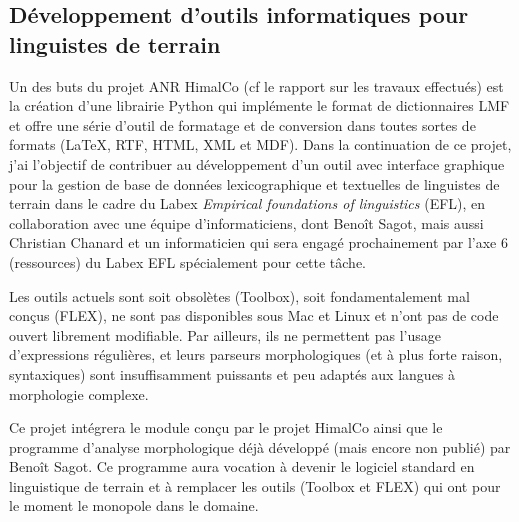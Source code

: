 \documentclass[oldfontcommands,oneside,a4paper,11pt]{article}
\begin{document}
\subsection{Développement d'outils informatiques pour linguistes de terrain} \label{sec:outils}
Un des buts du projet ANR HimalCo (cf le rapport sur les travaux effectués) est   la création d'une librairie Python qui implémente le format de dictionnaires LMF et offre une série d'outil de formatage et de conversion dans toutes sortes de formats (\LaTeX, RTF, HTML, XML et MDF). Dans la continuation de ce projet, j'ai l'objectif de contribuer au développement d'un outil avec interface graphique pour la gestion de base de données lexicographique et textuelles de linguistes de terrain dans le cadre du Labex \textit{Empirical foundations of linguistics} (EFL), en collaboration avec une équipe d'informaticiens, dont Benoît Sagot, mais aussi Christian Chanard et un informaticien qui sera engagé prochainement par l'axe 6 (ressources) du Labex EFL spécialement pour cette tâche. 

Les outils actuels sont soit obsolètes (Toolbox), soit fondamentalement mal conçus (FLEX), ne sont pas disponibles sous Mac et Linux et n'ont pas de code ouvert librement modifiable. Par ailleurs, ils ne permettent pas l'usage d'expressions régulières, et leurs parseurs morphologiques (et à plus forte raison, syntaxiques) sont insuffisamment puissants et peu adaptés aux langues à morphologie complexe. 

Ce projet intégrera le module conçu par le projet HimalCo ainsi que le programme d'analyse morphologique déjà développé (mais encore non publié) par Benoît Sagot. Ce programme aura vocation à devenir le logiciel standard en linguistique de terrain et à remplacer les outils (Toolbox et FLEX) qui ont pour le moment le monopole dans le domaine.


 


 
\end{document}
